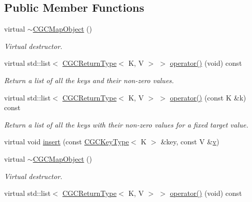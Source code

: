 \subsection*{Public Member Functions}
\begin{DoxyCompactItemize}
\item 
virtual \mbox{\hyperlink{classHadron_1_1CGCMapObject_aee79d26f143bad748680b674763b831f}{$\sim$\+C\+G\+C\+Map\+Object}} ()
\begin{DoxyCompactList}\small\item\em Virtual destructor. \end{DoxyCompactList}\item 
virtual std\+::list$<$ \mbox{\hyperlink{structHadron_1_1CGCReturnType}{C\+G\+C\+Return\+Type}}$<$ K, V $>$ $>$ \mbox{\hyperlink{classHadron_1_1CGCMapObject_aaa4b18e1a2845e16154cd434462c0779}{operator()}} (void) const
\begin{DoxyCompactList}\small\item\em Return a list of all the keys and their non-\/zero values. \end{DoxyCompactList}\item 
virtual std\+::list$<$ \mbox{\hyperlink{structHadron_1_1CGCReturnType}{C\+G\+C\+Return\+Type}}$<$ K, V $>$ $>$ \mbox{\hyperlink{classHadron_1_1CGCMapObject_aeb342dc81f17743a25b969f540db4edf}{operator()}} (const K \&k) const
\begin{DoxyCompactList}\small\item\em Return a list of all the keys with their non-\/zero values for a fixed target value. \end{DoxyCompactList}\item 
virtual void \mbox{\hyperlink{classHadron_1_1CGCMapObject_a334a88a21755a64719b1081190d2bde2}{insert}} (const \mbox{\hyperlink{structHadron_1_1CGCKeyType}{C\+G\+C\+Key\+Type}}$<$ K $>$ \&key, const V \&\mbox{\hyperlink{adat__devel_2lib_2hadron_2hadron__timeslice_8cc_a716fc87f5e814be3ceee2405ed6ff22a}{v}})
\item 
virtual \mbox{\hyperlink{classHadron_1_1CGCMapObject_aee79d26f143bad748680b674763b831f}{$\sim$\+C\+G\+C\+Map\+Object}} ()
\begin{DoxyCompactList}\small\item\em Virtual destructor. \end{DoxyCompactList}\item 
virtual std\+::list$<$ \mbox{\hyperlink{structHadron_1_1CGCReturnType}{C\+G\+C\+Return\+Type}}$<$ K, V $>$ $>$ \mbox{\hyperlink{classHadron_1_1CGCMapObject_aaa4b18e1a2845e16154cd434462c0779}{operator()}} (void) const

\end{DoxyCompactItemize}
